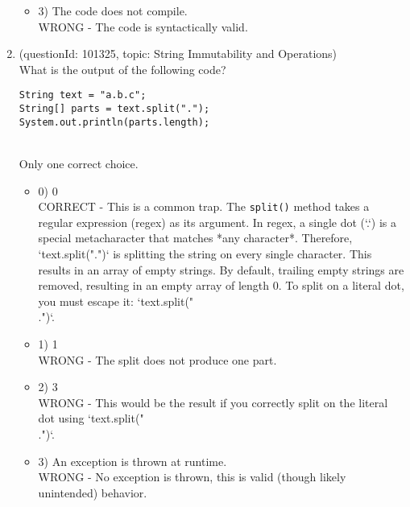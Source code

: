 \documentclass[12pt]{article}
\begin{document}
\begin{enumerate}[label=(\arabic*)]
\begin{itemize}
\item 3) The code does not compile.
 \\ 
WRONG - The code is syntactically valid.

\end{itemize}
\item (questionId: 101325, topic: String Immutability and Operations) \\ 
What is the output of the following code?
\begin{verbatim}
String text = "a.b.c";
String[] parts = text.split(".");
System.out.println(parts.length);
\end{verbatim}
\\ \noindent Only one correct choice. 
\begin{itemize}
\item 0) 0
 \\ 
CORRECT - This is a common trap. The \verb|split()| method takes a regular expression (regex) as its argument. In regex, a single dot (`.`) is a special metacharacter that matches *any character*. Therefore, `text.split(".")` is splitting the string on every single character. This results in an array of empty strings. By default, trailing empty strings are removed, resulting in an empty array of length 0. To split on a literal dot, you must escape it: `text.split("\\.")`.

\item 1) 1
 \\ 
WRONG - The split does not produce one part.

\item 2) 3
 \\ 
WRONG - This would be the result if you correctly split on the literal dot using `text.split("\\.")`.

\item 3) An exception is thrown at runtime.
 \\ 
WRONG - No exception is thrown, this is valid (though likely unintended) behavior.


\end{itemize}
\end{enumerate}
\end{document}
